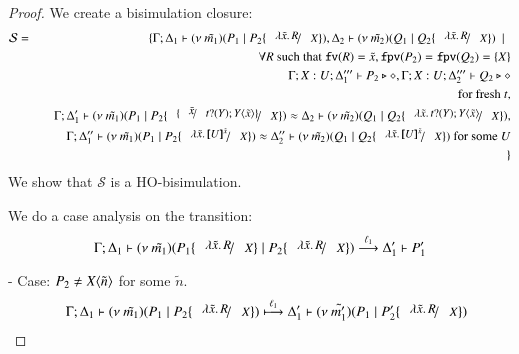 \begin{proof}
	We create a bisimulation closure:
%
	\begin{eqnarray*}
		\mathcal{S} &=&
			\set{\horel{\Gamma}{\Delta_1}{\newsp{\tilde{m_1}}{P_1 \Par P_2 \subst{\abs{\tilde{x}}{R}}{X}}}{,}
			{\Delta_2}{\newsp{\tilde{m_2}}{Q_1 \Par Q_2 \subst{\abs{\tilde{x}}{R}}{X}}} \setbar \\
			&& \quad \forall R \textrm{ such that } \fv{R} = \tilde{x}, \fpv{P_2} = \fpv{Q_2} = \set{X}\\
			&& \quad \Gamma; X: U; \Delta_1''' \proves P_2 \hastype \Proc, \Gamma; X: U; \Delta_2''' \proves Q_2 \hastype \Proc\\
			&& \quad \textrm{for fresh } t,\\
			&& \quad \horel{\Gamma}{\Delta_1'}{\newsp{\tilde{m_1}}{P_1 \Par P_2 \subst{\subst{\tilde{x}}{\binp{t}{Y} \appl{Y}{\tilde{x}}}}{X}}}{\wb}{\Delta_2}{\newsp{\tilde{m_2}}{Q_1 \Par Q_2 \subst{\abs{\tilde{x}}{\binp{t}{Y} \appl{Y}{\tilde{x}}}}{X}}},\\
			&& \quad \horel{\Gamma}{\Delta_1''}{\newsp{\tilde{m_1}}{P_1 \Par P_2 \subst{\abs{\tilde{x}}{\map{U}^{\tilde{x}}}}{X}}}{\wb}{\Delta_2''}{\newsp{\tilde{m_2}}{Q_1 \Par Q_2 \subst{\abs{\tilde{x}}{\map{U}^{\tilde{x}}}}{X}} \textrm{ for some } U}\\
			&&}
	\end{eqnarray*}
%
	\noi  We show that $\mathcal{S}$ is a HO-bisimulation.

	\noi We do a case analysis on the transition:
%
	\[
		\horel{\Gamma}{\Delta_1}{\newsp{\tilde{m_1}}{P_1 \subst{\abs{\tilde{x}}{R}}{X} \Par P_2\subst{\abs{\tilde{x}}{R}}{X} }}{\by{\ell_1}}{\Delta_1'}{P_1'}
	\]
%

	\noi - Case: $P_2 \not= X\langle \tilde{n} \rangle$ for some $\tilde{n}$.
%
	\begin{eqnarray*}
		&&	\horel{\Gamma}{\Delta_1}
			{\newsp{\tilde{m_1}}{P_1 \Par P_2 \subst{\abs{\tilde{x}}{R}}{X} }}
			{\hby{\ell_1}}
			{\Delta_1'}{\newsp{\tilde{m_1'}}{P_1 \Par P_2' \subst{\abs{\tilde{x}}{R}}{X}}}
	\end{eqnarray*}


\end{proof}
